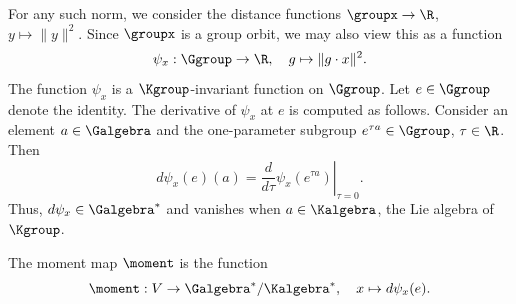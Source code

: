 For any such norm, we consider the distance functions $\groupx \to \R$, $y \mapsto \|y\|^2$. Since $\groupx$ is a group orbit, we may also view this as a function 
\begin{equation}
    \label{eq:def-psi}
    \psi_x:\Ggroup \to \R, \quad g \mapsto \|g\cdot x\|^2. 
\end{equation}
The function $\psi_x$ is a $\Kgroup$-invariant function on $\Ggroup$. Let $e \in \Ggroup$ denote the identity. The derivative of $\psi_x$ at $e$ is computed as follows. Consider an element $a \in \Galgebra$ and the one-parameter subgroup $e^{\tau a} \in \Ggroup$, $\tau \in \R$. Then 
\begin{equation}
    \label{eq:def-psi2}
    d\psi_x(e)(a) = \left. \frac{d}{d\tau} \psi_x(e^{\tau a})\right|_{\tau=0}.
\end{equation}
Thus, $d\psi_x \in \Galgebra^*$ and vanishes when $a \in \Kalgebra$, the Lie algebra of $\Kgroup$.

\begin{defn}
The moment map $\moment$ is the function
\begin{equation}
    \label{eq:def-psi3}
    \moment: V \to \Galgebra^*/\Kalgebra^*, \quad x \mapsto d\psi_x(e).
\end{equation}
\end{defn}


